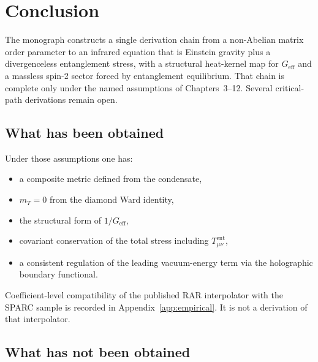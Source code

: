 \chapter{Conclusion}
\label{ch:conclusion}

The monograph constructs a single derivation chain from a non-Abelian
matrix order parameter to an infrared equation that is Einstein gravity
plus a divergenceless entanglement stress, with a structural heat-kernel
map for \(G_{\mathrm{eff}}\) and a massless spin-2 sector forced by
entanglement equilibrium. That chain is complete only under the named
assumptions of Chapters~3--12. Several critical-path derivations
remain open.

\section{What has been obtained}
\label{sec:concl-obtained}

Under those assumptions one has:
\begin{itemize}
  \item a composite metric defined from the condensate,
  \item \(m_T=0\) from the diamond Ward identity,
  \item the structural form of \(1/G_{\mathrm{eff}}\),
  \item covariant conservation of the total stress including
        \(T_{\mu\nu}^{\mathrm{ent}}\),
  \item a consistent regulation of the leading vacuum-energy term
        via the holographic boundary functional.
\end{itemize}
Coefficient-level compatibility of the published RAR interpolator with
the SPARC sample is recorded in Appendix~\ref{app:empirical}. It is not
a derivation of that interpolator.

\section{What has not been obtained}
\label{sec:concl-not}

